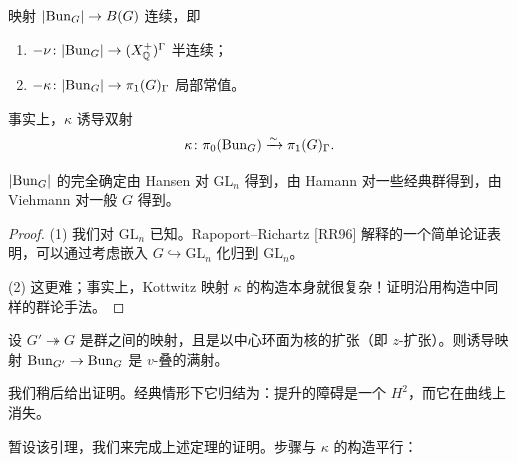 \begin{theorem}
映射 $|\mathrm{Bun}_G|\to B(G)$ 连续，即
\begin{enumerate}[label=(\arabic*)]
\item $-\nu\colon|\mathrm{Bun}_G|\to(X^{+}_{\mathbb{Q}})^{\Gamma}$ 半连续；
\item $-\kappa\colon|\mathrm{Bun}_G|\to\pi_1(G)_{\Gamma}$ 局部常值。
\end{enumerate}
事实上，$\kappa$ 诱导双射
\[
\kappa\colon\pi_0(\mathrm{Bun}_G)\xrightarrow{\sim}\pi_1(G)_{\Gamma}.
\]
\end{theorem}

\begin{remark}
$|\mathrm{Bun}_G|$ 的完全确定由 Hansen 对 $\mathrm{GL}_n$ 得到，由 Hamann 对一些经典群得到，由 Viehmann 对一般 $G$ 得到。
\end{remark}

\begin{proof}
(1) 我们对 $\mathrm{GL}_n$ 已知。Rapoport–Richartz [RR96] 解释的一个简单论证表明，可以通过考虑嵌入 $G\hookrightarrow\mathrm{GL}_n$ 化归到 $\mathrm{GL}_n$。

(2) 这更难；事实上，Kottwitz 映射 $\kappa$ 的构造本身就很复杂！证明沿用构造中同样的群论手法。
\end{proof}


\begin{lemma}
设 $G'\twoheadrightarrow G$ 是群之间的映射，且是以中心环面为核的扩张（即 $z$-扩张）。则诱导映射 $\mathrm{Bun}_{G'}\to\mathrm{Bun}_G$ 是 $v$-叠的满射。
\end{lemma}

我们稍后给出证明。经典情形下它归结为：提升的障碍是一个 $H^2$，而它在曲线上消失。

暂设该引理，我们来完成上述定理的证明。步骤与 $\kappa$ 的构造平行：

